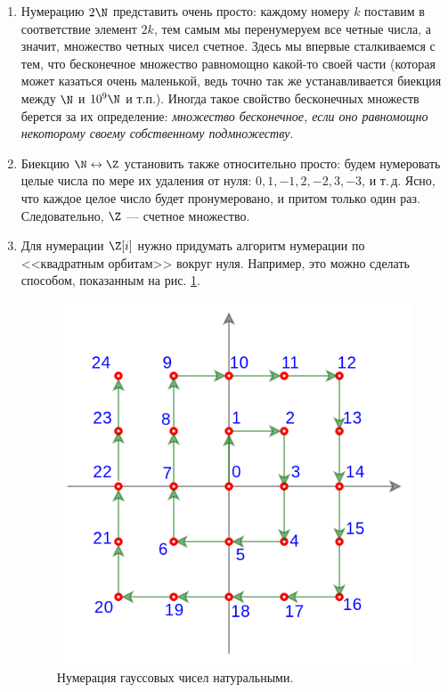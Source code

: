 \begin{enumerate}
\item Нумерацию $2\N$ представить очень просто: каждому номеру $k$ поставим в соответствие элемент $2k$, тем самым мы перенумеруем все четные числа, а значит, множество четных чисел счетное. Здесь мы впервые сталкиваемся с тем, что бесконечное множество равномощно какой-то своей части (которая может казаться очень маленькой, ведь точно так же устанавливается биекция между $\N$ и $10^9\N$ и т.п.). Иногда такое свойство бесконечных множеств берется за их определение:\textit{ множество бесконечное, если оно равномощно некоторому своему собственному подмножеству}.
\item Биекцию $\N\leftrightarrow\Z$ установить также относительно просто: будем нумеровать целые числа по мере их удаления от нуля: $0, 1, -1, 2, -2, 3, -3$, и т.\,д. Ясно, что каждое целое число будет пронумеровано, и притом только один раз. Следовательно, $\Z$ --- счетное множество.
\item Для нумерации $\Z[i]$ нужно придумать алгоритм нумерации по <<квадратным орбитам>> вокруг нуля. Например, это можно сделать способом, показанным на рис. \ref{ZZ}.
\begin{figure}[hbt!]
\begin{center}
\includegraphics[scale=0.3]{ZZ.png}
\end{center}\caption{Нумерация гауссовых чисел натуральными.}\label{ZZ}
\end{figure}


\end{enumerate}
